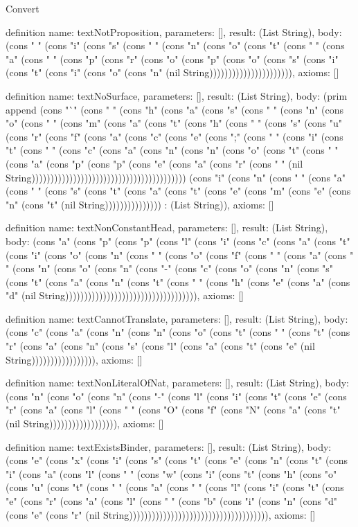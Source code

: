 \begin{lexlean}{Convert}
\begin{semanticmodule}
definition{
  name: textNotProposition,
  parameters: [],
  result: (List String),
  body: (cons " " (cons "i" (cons "s" (cons " " (cons "n" (cons "o" (cons "t" (cons " " (cons "a" (cons " " (cons "p" (cons "r" (cons "o" (cons "p" (cons "o" (cons "s" (cons "i" (cons "t" (cons "i" (cons "o" (cons "n" (nil String)))))))))))))))))))))),
  axioms: []
}

definition{
  name: textNoSurface,
  parameters: [],
  result: (List String),
  body: (prim append (cons "`" (cons " " (cons "h" (cons "a" (cons "s" (cons " " (cons "n" (cons "o" (cons " " (cons "m" (cons "a" (cons "t" (cons "h" (cons " " (cons "s" (cons "u" (cons "r" (cons "f" (cons "a" (cons "c" (cons "e" (cons ";" (cons " " (cons "i" (cons "t" (cons " " (cons "c" (cons "a" (cons "n" (cons "n" (cons "o" (cons "t" (cons " " (cons "a" (cons "p" (cons "p" (cons "e" (cons "a" (cons "r" (cons " " (nil String))))))))))))))))))))))))))))))))))))))))) (cons "i" (cons "n" (cons " " (cons "a" (cons " " (cons "s" (cons "t" (cons "a" (cons "t" (cons "e" (cons "m" (cons "e" (cons "n" (cons "t" (nil String))))))))))))))) : (List String)),
  axioms: []
}

definition{
  name: textNonConstantHead,
  parameters: [],
  result: (List String),
  body: (cons "a" (cons "p" (cons "p" (cons "l" (cons "i" (cons "c" (cons "a" (cons "t" (cons "i" (cons "o" (cons "n" (cons " " (cons "o" (cons "f" (cons " " (cons "a" (cons " " (cons "n" (cons "o" (cons "n" (cons "-" (cons "c" (cons "o" (cons "n" (cons "s" (cons "t" (cons "a" (cons "n" (cons "t" (cons " " (cons "h" (cons "e" (cons "a" (cons "d" (nil String))))))))))))))))))))))))))))))))))),
  axioms: []
}

definition{
  name: textCannotTranslate,
  parameters: [],
  result: (List String),
  body: (cons "c" (cons "a" (cons "n" (cons "n" (cons "o" (cons "t" (cons " " (cons "t" (cons "r" (cons "a" (cons "n" (cons "s" (cons "l" (cons "a" (cons "t" (cons "e" (nil String))))))))))))))))),
  axioms: []
}

definition{
  name: textNonLiteralOfNat,
  parameters: [],
  result: (List String),
  body: (cons "n" (cons "o" (cons "n" (cons "-" (cons "l" (cons "i" (cons "t" (cons "e" (cons "r" (cons "a" (cons "l" (cons " " (cons "O" (cons "f" (cons "N" (cons "a" (cons "t" (nil String)))))))))))))))))),
  axioms: []
}

definition{
  name: textExistsBinder,
  parameters: [],
  result: (List String),
  body: (cons "e" (cons "x" (cons "i" (cons "s" (cons "t" (cons "e" (cons "n" (cons "t" (cons "i" (cons "a" (cons "l" (cons " " (cons "w" (cons "i" (cons "t" (cons "h" (cons "o" (cons "u" (cons "t" (cons " " (cons "a" (cons " " (cons "l" (cons "i" (cons "t" (cons "e" (cons "r" (cons "a" (cons "l" (cons " " (cons "b" (cons "i" (cons "n" (cons "d" (cons "e" (cons "r" (nil String))))))))))))))))))))))))))))))))))))),
  axioms: []
}


\end{semanticmodule}
\end{lexlean}
